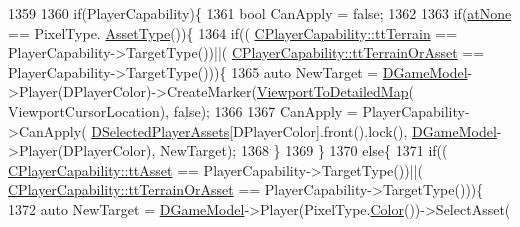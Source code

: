 \begin{DoxyCode}
1359                 
1360                                             \textcolor{keywordflow}{if}(PlayerCapability)\{
1361                                                 \textcolor{keywordtype}{bool} CanApply = \textcolor{keyword}{false};
1362 
1363                                                 \textcolor{keywordflow}{if}(\hyperlink{GameDataTypes_8h_a5600d4fc433b83300308921974477feca82fb51718e2c00981a2d37bc6fe92593}{atNone} == PixelType.
      \hyperlink{classCPixelType_addcf6c6d11e8ebafe4455beaa995b675}{AssetType}())\{
1364                                                     \textcolor{keywordflow}{if}((
      \hyperlink{classCPlayerCapability_a9d3450ed1532fd536bd6cbb1e2eef02fa465193c39da3100a1ce87c4a01a7ec2f}{CPlayerCapability::ttTerrain} == PlayerCapability->TargetType())||(
      \hyperlink{classCPlayerCapability_a9d3450ed1532fd536bd6cbb1e2eef02fa67cc6d11bc0aafc1b786bd6557ba4aa2}{CPlayerCapability::ttTerrainOrAsset} == PlayerCapability->TargetType()))\{
1365                                                         \textcolor{keyword}{auto} NewTarget = 
      \hyperlink{classCApplicationData_a32b50c7c1cbac3cfd67c7f775b1d6fee}{DGameModel}->Player(DPlayerColor)->CreateMarker(\hyperlink{classCApplicationData_a2871f1b0855d14ed77db1abd83585d64}{ViewportToDetailedMap}(
      ViewportCursorLocation), \textcolor{keyword}{false});
1366 
1367                                                         CanApply = PlayerCapability->CanApply(
      \hyperlink{classCApplicationData_a05c1087d5a5c4ddc14fcb37444f1642b}{DSelectedPlayerAssets}[DPlayerColor].front().lock(), 
      \hyperlink{classCApplicationData_a32b50c7c1cbac3cfd67c7f775b1d6fee}{DGameModel}->Player(DPlayerColor), NewTarget);  
1368                                                     \}
1369                                                 \}
1370                                                 \textcolor{keywordflow}{else}\{
1371                                                     \textcolor{keywordflow}{if}((
      \hyperlink{classCPlayerCapability_a9d3450ed1532fd536bd6cbb1e2eef02facb6ee2a28b5d50b9d3009c272f2881aa}{CPlayerCapability::ttAsset} == PlayerCapability->TargetType())||(
      \hyperlink{classCPlayerCapability_a9d3450ed1532fd536bd6cbb1e2eef02fa67cc6d11bc0aafc1b786bd6557ba4aa2}{CPlayerCapability::ttTerrainOrAsset} == PlayerCapability->TargetType()))\{
1372                                                         \textcolor{keyword}{auto} NewTarget = 
      \hyperlink{classCApplicationData_a32b50c7c1cbac3cfd67c7f775b1d6fee}{DGameModel}->Player(PixelType.\hyperlink{classCPixelType_a54864220447608dfad4cd579a5a4016c}{Color}())->SelectAsset(

\end{DoxyCode}
